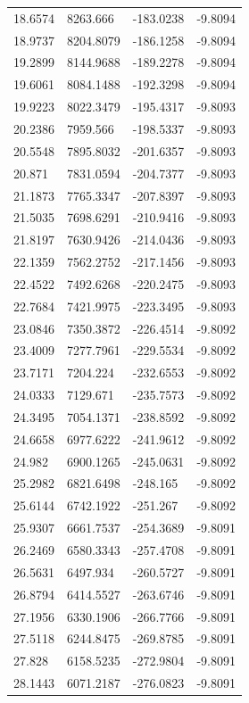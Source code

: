 \begin{table}[H]
\begin{tabular}{llll}
18.6574 & 8263.666 & -183.0238 & -9.8094 \\
18.9737 & 8204.8079 & -186.1258 & -9.8094 \\
19.2899 & 8144.9688 & -189.2278 & -9.8094 \\
19.6061 & 8084.1488 & -192.3298 & -9.8094 \\
19.9223 & 8022.3479 & -195.4317 & -9.8093 \\
20.2386 & 7959.566 & -198.5337 & -9.8093 \\
20.5548 & 7895.8032 & -201.6357 & -9.8093 \\
20.871 & 7831.0594 & -204.7377 & -9.8093 \\
21.1873 & 7765.3347 & -207.8397 & -9.8093 \\
21.5035 & 7698.6291 & -210.9416 & -9.8093 \\
21.8197 & 7630.9426 & -214.0436 & -9.8093 \\
22.1359 & 7562.2752 & -217.1456 & -9.8093 \\
22.4522 & 7492.6268 & -220.2475 & -9.8093 \\
22.7684 & 7421.9975 & -223.3495 & -9.8093 \\
23.0846 & 7350.3872 & -226.4514 & -9.8092 \\
23.4009 & 7277.7961 & -229.5534 & -9.8092 \\
23.7171 & 7204.224 & -232.6553 & -9.8092 \\
24.0333 & 7129.671 & -235.7573 & -9.8092 \\
24.3495 & 7054.1371 & -238.8592 & -9.8092 \\
24.6658 & 6977.6222 & -241.9612 & -9.8092 \\
24.982 & 6900.1265 & -245.0631 & -9.8092 \\
25.2982 & 6821.6498 & -248.165 & -9.8092 \\
25.6144 & 6742.1922 & -251.267 & -9.8092 \\
25.9307 & 6661.7537 & -254.3689 & -9.8091 \\
26.2469 & 6580.3343 & -257.4708 & -9.8091 \\
26.5631 & 6497.934 & -260.5727 & -9.8091 \\
26.8794 & 6414.5527 & -263.6746 & -9.8091 \\
27.1956 & 6330.1906 & -266.7766 & -9.8091 \\
27.5118 & 6244.8475 & -269.8785 & -9.8091 \\
27.828 & 6158.5235 & -272.9804 & -9.8091 \\
28.1443 & 6071.2187 & -276.0823 & -9.8091 \\

\end{tabular}
\end{table}
